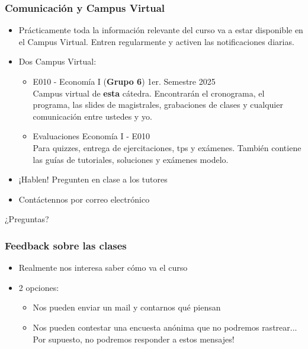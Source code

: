 \documentclass{beamer}
\begin{document}
\begin{frame}
    \frametitle{Comunicación y Campus Virtual}
    \begin{itemize}
        \item Prácticamente toda la información relevante del curso va a estar disponible en el Campus Virtual. Entren regularmente y activen las notificaciones diarias. \vspace{2mm}
        \item Dos Campus Virtual: \vspace{2mm}
        \begin{itemize}
            \item E010 - Economía I (\textbf{Grupo 6}) 1er. Semestre 2025 \\
            Campus virtual de \textbf{esta} cátedra. Encontrarán el cronograma, el programa, las slides de magistrales, grabaciones de clases y cualquier comunicación entre ustedes y yo. \vspace{2mm}
            \item Evaluaciones Economía I - E010
            \\ Para quizzes, entrega de ejercitaciones, tps y exámenes. También contiene las guías de tutoriales, soluciones y exámenes modelo.  \vspace{2mm}
        \end{itemize}
        \item ¡Hablen! Pregunten en clase a los tutores \vspace{2mm}
        \item Contáctennos por correo electrónico 
    \end{itemize}
\end{frame}

\begin{frame}
    \begin{center}
        \Huge ¿Preguntas?
    \end{center}
\end{frame}

\begin{frame}
    \frametitle{Feedback sobre las clases}
    \begin{itemize}
        \item Realmente nos interesa saber cómo va el curso \vspace{2mm}
        \item 2 opciones: \vspace{2mm}
        \begin{itemize}
            \item Nos pueden enviar un mail y contarnos qué piensan 
            \vspace{2mm}
            \item Nos pueden contestar una encuesta anónima que no podremos rastrear... Por supuesto, no podremos responder a estos mensajes!
        \end{itemize}
    \end{itemize}
\end{frame}
\end{document}
